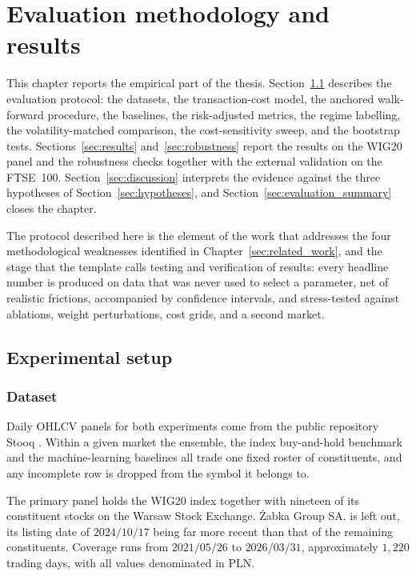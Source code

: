 \chapter{Evaluation methodology and results}\label{chap:evaluation}

This chapter reports the empirical part of the thesis. Section~\ref{sec:setup} describes the evaluation protocol: the datasets, the transaction-cost model, the anchored walk-forward procedure, the baselines, the risk-adjusted metrics, the regime labelling, the volatility-matched comparison, the cost-sensitivity sweep, and the bootstrap tests. Sections~\ref{sec:results} and~\ref{sec:robustness} report the results on the WIG20 panel and the robustness checks together with the external validation on the FTSE~100. Section~\ref{sec:discussion} interprets the evidence against the three hypotheses of Section~\ref{sec:hypotheses}, and Section~\ref{sec:evaluation_summary} closes the chapter.

The protocol described here is the element of the work that addresses the four methodological weaknesses identified in Chapter~\ref{sec:related_work}, and the stage that the template calls testing and verification of results: every headline number is produced on data that was never used to select a parameter, net of realistic frictions, accompanied by confidence intervals, and stress-tested against ablations, weight perturbations, cost grids, and a second market.

\section{Experimental setup}\label{sec:setup}

\subsection{Dataset}\label{subsec:dataset}

Daily OHLCV panels for both experiments come from the public repository Stooq \cite{stooq}. Within a given market the ensemble, the index buy-and-hold benchmark and the machine-learning baselines all trade one fixed roster of constituents, and any incomplete row is dropped from the symbol it belongs to.

The primary panel holds the WIG20 index together with nineteen of its constituent stocks on the Warsaw Stock Exchange. \.{Z}abka Group SA. is left out, its listing date of $2024/10/17$ being far more recent than that of the remaining constituents. Coverage runs from $2021/05/26$ to $2026/03/31$, approximately $1{,}220$ trading days, with all values denominated in PLN.

